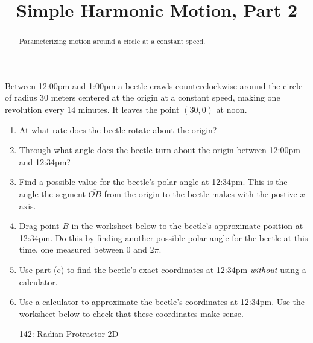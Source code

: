 \documentclass{ximera}
\title{Simple Harmonic Motion, Part 2}
\begin{document}
\begin{abstract}
Parameterizing motion around a circle at a constant speed.
\end{abstract}
\maketitle



\begin{example}  \label{Exp89dfe94tf4}

Between 12:00pm and 1:00pm a beetle crawls counterclockwise around the circle of radius $30$ meters centered at the origin at a constant speed, making one revolution every $14$ minutes.  It leaves the point $(30,0)$ at noon.

\begin{enumerate}

\item At what rate does the beetle rotate about the origin?

\item Through what angle does the beetle turn about the origin between 12:00pm and 12:34pm?

\item Find a possible value for the beetle's polar angle at 12:34pm. This is the angle the segment $\overline{OB}$ from the origin to the beetle makes with the postive $x$-axis.

\item Drag point $B$ in the worksheet below to the beetle's approximate position at 12:34pm. Do this by finding another possible polar angle for the beetle at this time, one measured between $0$ and $2\pi$.

\item Use part (c) to find the beetle's exact coordinates at 12:34pm \emph{without} using a calculator.

\item Use a calculator to approximate the beetle's coordinates at 12:34pm. Use the worksheet below to check that these coordinates make sense.



\begin{onlineOnly}
    \begin{center}
\end{center}
\end{onlineOnly}

\href{https://www.desmos.com/calculator/qjrantrk6e}{142: Radian Protractor 2D}



\end{enumerate}

\end{example}
\end{document}

